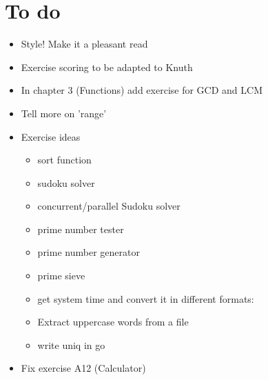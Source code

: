 \section{To do}

\begin{itemize}
\item
Style! Make it a pleasant read
\item
Exercise scoring to be adapted to Knuth
\item
In chapter 3 (Functions) add exercise for GCD and LCM
\item
Tell more on 'range'
\item
Exercise ideas
\begin{itemize}
\item
sort function
\item
sudoku solver
\item
concurrent/parallel Sudoku solver
\item
prime number tester
\item
prime number generator
\item
prime sieve
\item
get system time and convert it in different formats:
\item
Extract uppercase words from a file
\item
write uniq in go
\end{itemize}
\item
Fix exercise A12 (Calculator)
\end{itemize}
